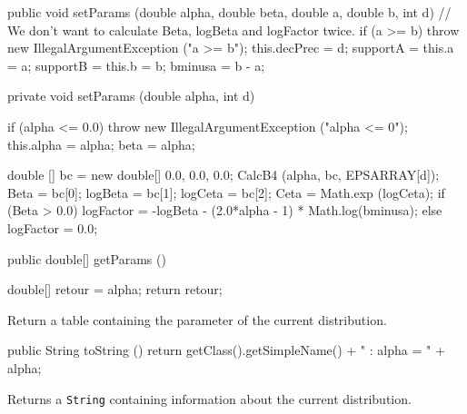 \begin{code}\begin{hide}

   public void setParams (double alpha, double beta, double a, double b, int d) {
      // We don't want to calculate Beta, logBeta and logFactor twice.
      if (a >= b)
         throw new IllegalArgumentException ("a >= b");
      this.decPrec = d;
      supportA = this.a = a;
      supportB = this.b = b;
      bminusa = b - a;
    }

   private void setParams (double alpha, int d) {
      if (alpha <= 0.0)
         throw new IllegalArgumentException ("alpha <= 0");
      this.alpha = alpha;
      beta = alpha;

      double [] bc = new double[] {0.0, 0.0, 0.0};
      CalcB4 (alpha, bc, EPSARRAY[d]);
      Beta = bc[0]; logBeta = bc[1]; logCeta = bc[2];
      Ceta = Math.exp (logCeta);
      if (Beta > 0.0)
         logFactor = -logBeta - (2.0*alpha - 1) * Math.log(bminusa);
      else
         logFactor = 0.0;
    }\end{hide}

   public double[] getParams ()\begin{hide} {
      double[] retour = {alpha};
      return retour;
   }\end{hide}
\end{code}
\begin{tabb}
   Return a table containing the parameter of the current distribution.
\end{tabb}
\begin{hide}\begin{code}

   public String toString () {
      return getClass().getSimpleName() + " : alpha = " + alpha;
   }
\end{code}
\begin{tabb}
   Returns a \texttt{String} containing information about the current distribution.
\end{tabb}\end{hide}
\begin{code}\begin{hide}
}\end{hide}
\end{code}
